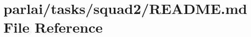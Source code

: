 \hypertarget{parlai_2tasks_2squad2_2README_8md}{}\section{parlai/tasks/squad2/\+R\+E\+A\+D\+ME.md File Reference}
\label{parlai_2tasks_2squad2_2README_8md}
